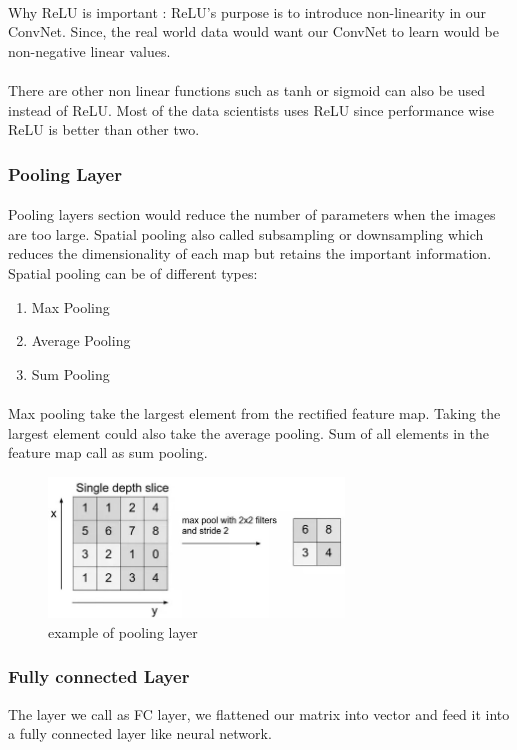 \paragraph{}
Why ReLU is important : ReLU’s purpose is to introduce non-linearity in our ConvNet. Since, the real world data would want our ConvNet to learn would be non-negative linear values.
\paragraph{}
There are other non linear functions such as tanh or sigmoid can also be used instead of ReLU. Most of the data scientists uses ReLU since performance wise ReLU is better than other two.
\subsubsection{Pooling Layer}
\paragraph{}
Pooling layers section would reduce the number of parameters when the images are too large. Spatial pooling also called subsampling or downsampling which reduces the dimensionality of each map but retains the important information. Spatial pooling can be of different types:
\begin{enumerate}
	\item Max Pooling
	\item Average Pooling
	\item Sum Pooling
\end{enumerate}
\paragraph{}
Max pooling take the largest element from the rectified feature map. Taking the largest element could also take the average pooling. Sum of all elements in the feature map call as sum pooling.
\begin{figure}
	\centering
	\includegraphics[width=0.7\textwidth]{pooling_layer.jpg}
	\caption{example of pooling layer}
\end{figure}
\subsubsection{Fully connected Layer}
The layer we call as FC layer, we flattened our matrix into vector and feed it into a fully connected layer like neural network.





